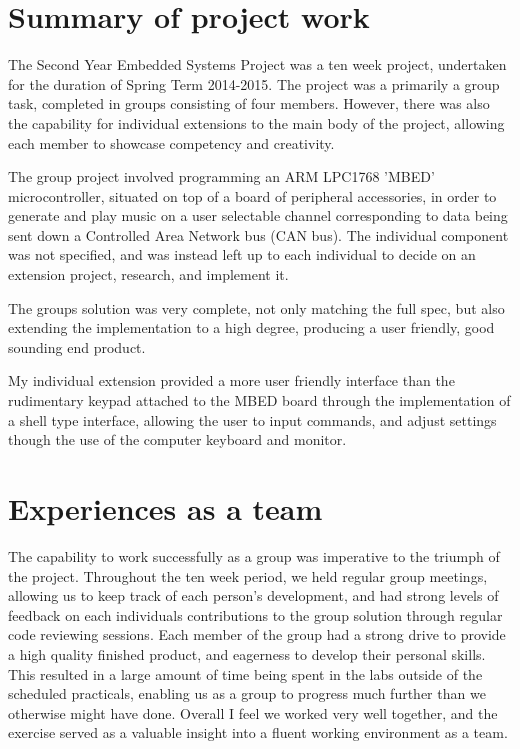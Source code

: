 \section{Summary of project work}
The Second Year Embedded Systems Project was a ten week project, undertaken 
for the duration of Spring Term 2014-2015. The project was a primarily a 
group task, completed in groups consisting of four members. However, there 
was also the capability for individual extensions to the main body of the 
project, allowing each member to showcase competency and creativity.

The group project involved programming an ARM LPC1768 'MBED' microcontroller, 
situated on top of a board of peripheral accessories, in order to 
generate and play music on a user selectable channel corresponding to data 
being sent down a Controlled Area Network bus (CAN bus). The individual 
component was not specified, and was instead left up to each individual to 
decide on an extension project, research, and implement it. 

The groups solution was very complete, not only matching the full spec, but also
extending the implementation to a high degree, producing a user friendly, good 
sounding end product. 

My individual extension provided a more user friendly interface than the 
rudimentary keypad attached to the MBED board through the implementation of a 
shell type interface, allowing the user to input commands, and adjust settings
though the use of the computer keyboard and monitor. 
 
\section{Experiences as a team}
The capability to work successfully as a group was imperative to the triumph of
the project. Throughout the ten week period, we held regular group meetings, 
allowing us to keep track of each person's development, and had strong levels 
of feedback on each individuals contributions to the group solution through 
regular code reviewing sessions. Each member of the group had a strong drive to 
provide a high quality finished product, and eagerness to develop their 
personal skills. This resulted in a large amount of time being spent in the 
labs outside of the scheduled practicals, enabling us as a group to progress 
much further than we otherwise might have done. Overall I feel we worked very 
well together, and the exercise served as a valuable insight into a fluent 
working environment as a team. 


